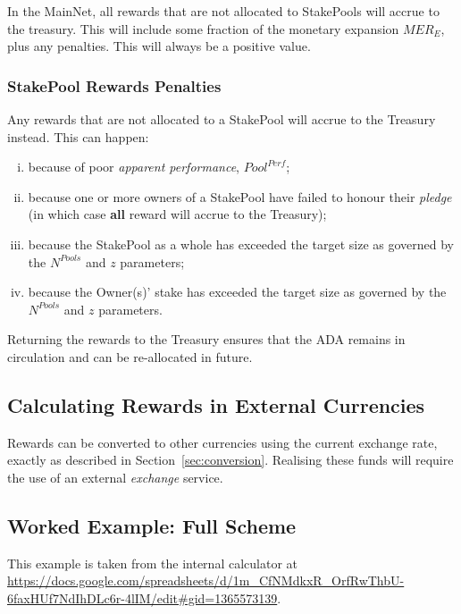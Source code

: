 \documentclass[11pt,a4paper,dvipsnames,twosided,final]{article}
\newcommand{\khcomment}[1]{\todo[color=blue!20]{KH: #1}}
\newcommand{\ada}{ADA{}}
\begin{document}
In the MainNet, all rewards that are not allocated to StakePools will accrue to the treasury.  This will include some fraction of the
monetary expansion $\textit{MER}_E$, plus any penalties.  This will always be a positive value.

\subsubsection*{StakePool Rewards Penalties}
\label{sec:penalties}

Any rewards that are not allocated to a StakePool will accrue to the Treasury instead.  This can happen: %

\begin{enumerate}[i)]
\item
  because of poor \emph{apparent performance}, $\textit{Pool}^{\textit{Perf}}$;
\item
  because one or more owners of a StakePool have failed to honour their \emph{pledge} (in which case \textbf{all} reward will accrue to the Treasury);
\item
  because the StakePool as a whole has exceeded the target size as governed by the $N^{\textit{Pools}}$ and $z$ parameters;
\item
  because the Owner(s)' stake has exceeded the target size as governed by the $N^{\textit{Pools}}$ and $z$ parameters.
\end{enumerate}

\noindent
Returning the rewards to the Treasury ensures that the \ada{} remains in circulation and can be re-allocated in future.



\subsection{Calculating Rewards in External Currencies}

Rewards can be converted to other currencies using the current exchange rate, exactly as described in
Section~\ref{sec:conversion}.  Realising these funds will require the use of an external \emph{exchange} service.

\clearpage
\subsection{Worked Example: Full Scheme}

This example is taken from the \IOHK{} internal calculator at
\url{https://docs.google.com/spreadsheets/d/1m_CfNMdkxR_OrfRwThbU-6faxHUf7NdIhDLc6r-4lIM/edit#gid=1365573139}.
\end{document}
